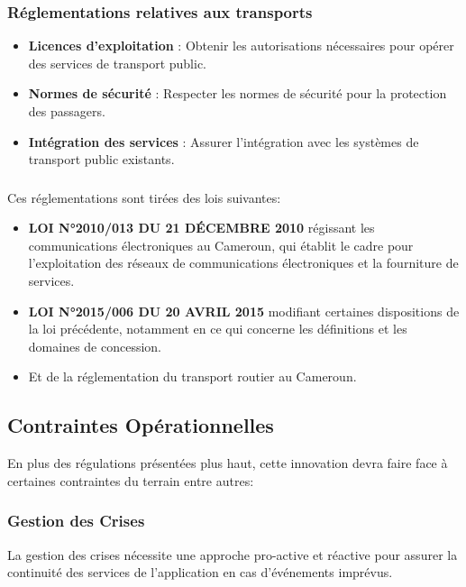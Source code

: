 \subsubsection*{Réglementations relatives aux transports}
\begin{itemize}
  \item \textbf{Licences d'exploitation} : Obtenir les autorisations nécessaires pour opérer des services de transport public.
  \item \textbf{Normes de sécurité} : Respecter les normes de sécurité pour la protection des passagers.
  \item \textbf{Intégration des services} : Assurer l'intégration avec les systèmes de transport public existants.
\end{itemize}

\subsubsection*{}
Ces réglementations sont tirées des lois suivantes:

\begin{itemize}
  \item \textbf{LOI N°2010/013 DU 21 DÉCEMBRE 2010} régissant les communications électroniques au Cameroun, qui établit le cadre pour l'exploitation des réseaux de communications électroniques et la fourniture de services.\cite{Loi2010013}
  \item \textbf{LOI N°2015/006 DU 20 AVRIL 2015} modifiant certaines dispositions de la loi précédente, notamment en ce qui concerne les définitions et les domaines de concession.\cite{cameroon_law_2015}
  \item Et de la réglementation du transport routier au Cameroun.\cite{securoute2024}
\end{itemize}

\subsection{Contraintes Opérationnelles}

En plus des régulations présentées plus haut, cette innovation devra faire face à certaines contraintes du terrain entre autres:

\subsubsection*{Gestion des Crises}
La gestion des crises nécessite une approche pro-active et réactive pour assurer la continuité des services de l'application en cas d'événements imprévus.

